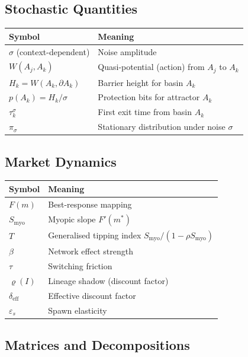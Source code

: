 \documentclass[12pt]{article}
\begin{document}
\subsection{Stochastic Quantities}

\begin{tabular}{ll}
\toprule
\textbf{Symbol} & \textbf{Meaning} \\
\midrule
$\sigma$ (context-dependent) & Noise amplitude \\
$W(A_j, A_k)$ & Quasi-potential (action) from $A_j$ to $A_k$ \\
$H_k = W(A_k, \partial A_k)$ & Barrier height for basin $A_k$ \\
$p(A_k) = H_k / \sigma$ & Protection bits for attractor $A_k$ \\
$\tau_k^\sigma$ & First exit time from basin $A_k$ \\
$\pi_\sigma$ & Stationary distribution under noise $\sigma$ \\
\bottomrule
\end{tabular}

\subsection{Market Dynamics}

\begin{tabular}{ll}
\toprule
\textbf{Symbol} & \textbf{Meaning} \\
\midrule
$F(m)$ & Best-response mapping \\
$S_{\text{myo}}$ & Myopic slope $F'(m^*)$ \\
$T$ & Generalised tipping index $S_{\text{myo}} / (1 - \rho S_{\text{myo}})$ \\
$\beta$ & Network effect strength \\
$\tau$ & Switching friction \\
$\varrho(I)$ & Lineage shadow (discount factor) \\
$\delta_{\text{eff}}$ & Effective discount factor \\
$\varepsilon_s$ & Spawn elasticity \\
\bottomrule
\end{tabular}

\subsection{Matrices and Decompositions}
\end{document}
